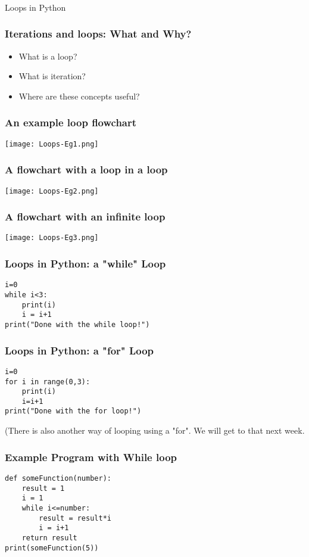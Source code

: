 \documentclass{beamer}
\begin{document}
\begin{frame}%
\frametitle{}
\centering Loops in Python
\end{frame}

\begin{frame}%
\frametitle{Iterations and loops: What and Why?}
\begin{itemize}
\item What is a loop? \pause
\item What is iteration? \pause 
\item Where are these concepts useful? \pause 
\end{itemize}
\end{frame}

\begin{frame}
\frametitle{An example loop flowchart}
\texttt{[image: Loops-Eg1.png]}
\end{frame}

\begin{frame}
\frametitle{A flowchart with a loop in a loop}
\texttt{[image: Loops-Eg2.png]}
\end{frame}

\begin{frame}
\frametitle{A flowchart with an infinite loop}
\texttt{[image: Loops-Eg3.png]}
\end{frame}

\begin{frame}[fragile]%
\frametitle{Loops in Python: a "while" Loop}
\begin{verbatim}
i=0
while i<3:
    print(i)
    i = i+1
print("Done with the while loop!")
\end{verbatim}
\end{frame}

\begin{frame}[fragile]%
\frametitle{Loops in Python: a "for" Loop}
\begin{verbatim}
i=0
for i in range(0,3):
    print(i)
    i=i+1
print("Done with the for loop!")
\end{verbatim}
(There is also another way of looping using a "for". We will get to that next week.
\end{frame}

\begin{frame}[fragile]
\frametitle{Example Program with While loop}
\begin{verbatim}
def someFunction(number):
    result = 1
    i = 1
    while i<=number:
        result = result*i
        i = i+1
    return result
print(someFunction(5)) 
\end{verbatim} 
\end{frame}
\end{document}
